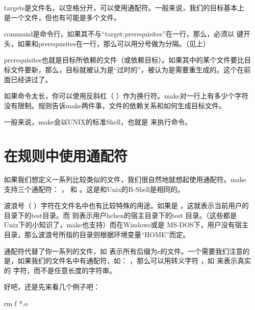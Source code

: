\documentclass[a4paper,10pt]{sphinxmanual}
\begin{document}
targets是文件名，以空格分开，可以使用通配符。一般来说，我们的目标基本上是一个文件，但也有可能是多个文件。

command是命令行，如果其不与“target:prerequisites”在一行，那么，必须以  键开头，如果和prerequisites在一行，那么可以用分号做为分隔。（见上）

prerequisites也就是目标所依赖的文件（或依赖目标）。如果其中的某个文件要比目标文件要新，那么，目标就被认为是“过时的”，被认为是需要重生成的。这个在前面已经讲过了。

如果命令太长，你可以使用反斜杠（ \sphinxcode{\sphinxupquote{\textbackslash{}}} ）作为换行符。make对一行上有多少个字符没有限制。规则告诉make两件事，文件的依赖关系和如何生成目标文件。

一般来说，make会以UNIX的标准Shell，也就是  来执行命令。


\section{在规则中使用通配符}
\label{\detokenize{rules:id4}}
如果我们想定义一系列比较类似的文件，我们很自然地就想起使用通配符。make支持三个通配符：
\sphinxcode{\sphinxupquote{*}} ，  和 \sphinxcode{\sphinxupquote{\textasciitilde{}}} 。这是和Unix的B-Shell是相同的。

波浪号（ \sphinxcode{\sphinxupquote{\textasciitilde{}}} ）字符在文件名中也有比较特殊的用途。如果是  ，这就表示当前用户的  目录下的test目录。而  则表示用户hchen的宿主目录下的test
目录。（这些都是Unix下的小知识了，make也支持）而在Windows或是 MS-DOS下，用户没有宿主目录，那么波浪号所指的目录则根据环境变量“HOME”而定。

通配符代替了你一系列的文件，如  表示所有后缀为c的文件。一个需要我们注意的是，如果我们的文件名中有通配符，如： \sphinxcode{\sphinxupquote{*}} ，那么可以用转义字符 \sphinxcode{\sphinxupquote{\textbackslash{}}} ，如 \sphinxcode{\sphinxupquote{\textbackslash{}*}} 来表示真实的 \sphinxcode{\sphinxupquote{*}}
字符，而不是任意长度的字符串。

好吧，还是先来看几个例子吧：

\begin{sphinxVerbatim}[commandchars=\\\{\}]
    rm \PYGZhy{}f *.o
\end{sphinxVerbatim}
\end{document}
